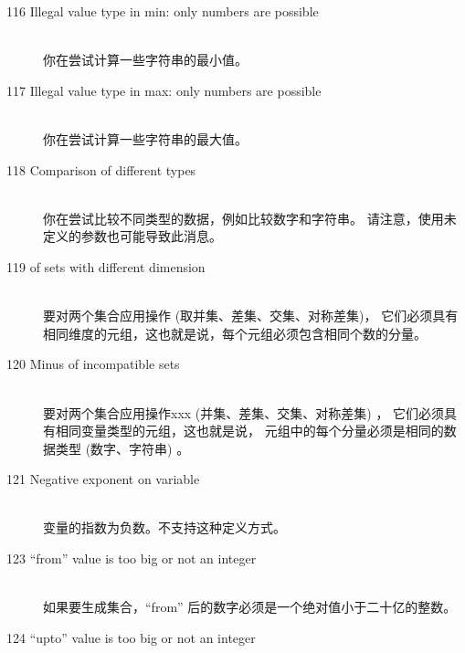 \begin{description}
\item[116 Illegal value type in min:  only numbers are possible]\ \\
  你在尝试计算一些字符串的最小值。
\item[117 Illegal value type in max:  only numbers are possible]\ \\
  你在尝试计算一些字符串的最大值。
\item[118 Comparison of different types]\ \\
  你在尝试比较不同类型的数据，例如比较数字和字符串。
  请注意，使用未定义的参数也可能导致此消息。
\item[119  of sets with different dimension]\ \\
  要对两个集合应用操作 (取并集、差集、交集、对称差集)，
  它们必须具有相同维度的元组，这也就是说，每个元组必须包含相同个数的分量。
\item[120 Minus of incompatible sets]\ \\
  要对两个集合应用操作xxx (并集、差集、交集、对称差集) ，
  它们必须具有相同变量类型的元组，这也就是说，
  元组中的每个分量必须是相同的数据类型 (数字、字符串) 。
\item[121 Negative exponent on variable]\ \\
  变量的指数为负数。不支持这种定义方式。
\item[123 ``from'' value  is too big or not an integer]\ \\
  如果要生成集合，``from'' 后的数字必须是一个绝对值小于二十亿的整数。
\item[124 ``upto'' value  is too big or not an integer]\ \\

\end{description}
